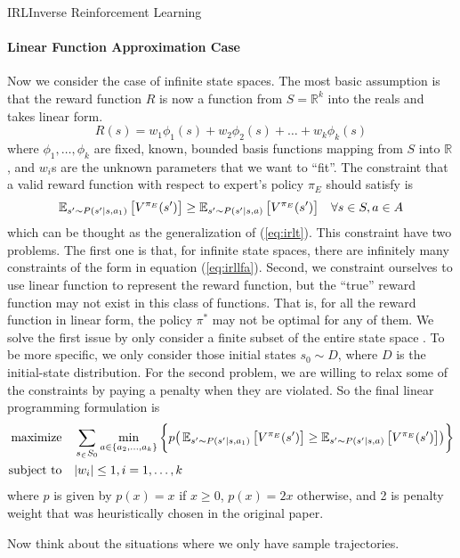 \documentclass[9pt]{article}
\begin{document}
\begin{topic}{IRL}{Inverse Reinforcement Learning}
\paragraph{Linear Function Approximation Case} Now we consider the case of infinite state spaces. The most basic assumption is that the reward function $R$ is now a function from $S=\mathbb{R}^k$ into the reals and takes linear form.
\[
R(s) = w_1\phi_1(s) + w_2\phi_2(s) + \dots +w_k\phi_k(s)
\]
where $\phi_1,\ldots, \phi_k$ are fixed, known, bounded basis functions mapping from $S$ into $\mathbb{R}$, and $w_i$s are the unknown parameters that we want to ``fit''. The constraint that a valid reward function with respect to expert's policy $\pi_E$ should satisfy is 
\begin{equation}
\label{eq:irllfa}
\operatorname{\mathbb{E}}_{s' \sim P(s'|s,a_1)}\big[V^{\pi_E}(s')\big] \ge \operatorname{\mathbb{E}}_{s' \sim P(s'|s,a)}\big[V^{\pi_E}(s')\big] \quad \forall s\in S, a\in A
\end{equation}
which can be thought as the generalization of (\ref{eq:irlt}). This constraint have two problems. The first one is that, for infinite state spaces, there are infinitely many constraints of the form in equation (\ref{eq:irllfa}). Second, we constraint ourselves to use linear function to represent the reward function, but the ``true'' reward function may not exist in this class of functions. That is, for all the reward function in linear form, the policy $\pi^*$ may not be optimal for any of them. We solve the first issue by only consider a finite subset of the entire state space . To be more specific, we only consider those initial states $s_0 \sim D$, where $D$ is the initial-state distribution. For the second problem, we are willing to relax some of the constraints by paying a penalty when they are violated. So the final linear programming formulation is
\[
\begin{split}
\text{maximize} & \quad \sum_{s_\in S_0} \min_{a\in \{a_2,\ldots,a_k\}}\bigg\{p\big(\operatorname{\mathbb{E}}_{s' \sim P(s'|s,a_1)}\big[V^{\pi_E}(s')\big] \ge \operatorname{\mathbb{E}}_{s' \sim P(s'|s,a)}\big[V^{\pi_E}(s')\big]\big) \bigg\}\\
\text{subject to} & \quad |w_i| \le 1, i = 1, \ldots, k
\end{split}
\]
where $p$ is given by $p(x) = x$ if $x\ge 0$, $p(x) = 2x$ otherwise, and 2 is penalty weight that was heuristically chosen in the original paper. 
 
Now think about the situations where we only have sample trajectories.

\end{topic}
\end{document}
